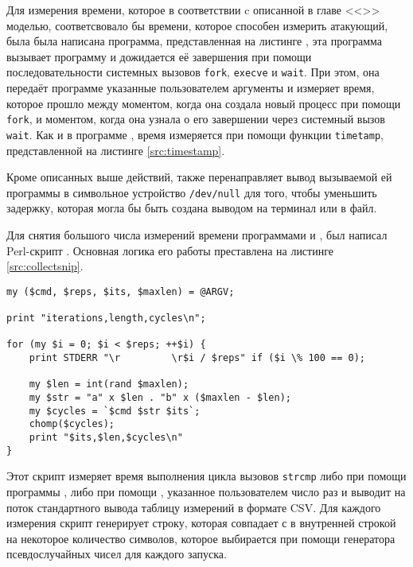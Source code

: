 Для измерения времени, которое в соответствии c описанной в главе
<<>> моделью, соответсвовало бы времени, которое способен
измерить атакующий, была была написана программа, представленная на листинге
, эта программа вызывает программу 
и дожидается её завершения при помощи последовательности системных вызовов
\texttt{fork}, \texttt{execve} и \texttt{wait}. При этом, она передаёт программе
 указанные пользователем аргументы и измеряет время, которое
прошло между моментом, когда она создала новый процесс при помощи \texttt{fork},
и моментом, когда она узнала о его завершении через системный вызов
\texttt{wait}. Как и в программе , время измеряется при помощи
функции \texttt{timetamp}, представленной на листинге \ref{src:timestamp}.

Кроме описанных выше действий,  также перенаправляет
вывод вызываемой ей программы в символьное устройство \texttt{/dev/null} для
того, чтобы уменьшить задержку, которая могла бы быть создана выводом на терминал
или в файл.

Для снятия большого числа измерений времени программами  и
, был написал Perl-скрипт . Основная
логика его работы преставлена на листинге \ref{src:collectsnip}.

\begin{lstlisting}[caption=Фрагмент скрипта \texttt{collect.pl}, label=src:collectsnip]
my ($cmd, $reps, $its, $maxlen) = @ARGV;

print "iterations,length,cycles\n";

for (my $i = 0; $i < $reps; ++$i) {
	print STDERR "\r         \r$i / $reps" if ($i \% 100 == 0);

	my $len = int(rand $maxlen);
	my $str = "a" x $len . "b" x ($maxlen - $len);
	my $cycles = `$cmd $str $its`;
	chomp($cycles);
	print "$its,$len,$cycles\n"
}
\end{lstlisting}

Этот скрипт измеряет время выполнения цикла вызовов \texttt{strcmp} либо при
помощи программы , либо при помощи ,
указанное пользователем число раз и выводит на поток стандартного вывода таблицу
измерений в формате CSV. Для каждого измерения скрипт генерирует строку, которая
совпадает с в внутренней строкой  на некоторое количество
символов, которое выбирается при помощи генератора псевдослучайных чисел для
каждого запуска.

\clearpage
